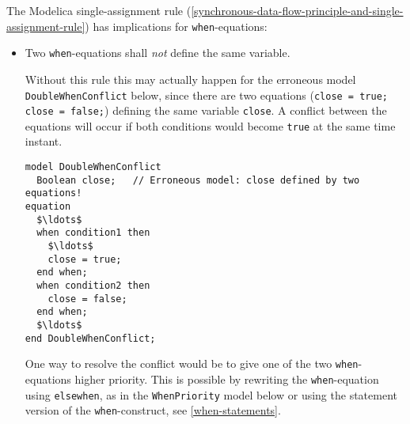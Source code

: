 The Modelica single-assignment rule (\cref{synchronous-data-flow-principle-and-single-assignment-rule}) has implications for \lstinline!when!-equations:
\begin{itemize}
\item
  Two \lstinline!when!-equations shall \emph{not} define the same variable.

\begin{nonnormative}
Without this rule this may actually happen for the erroneous model \lstinline!DoubleWhenConflict! below, since there are two equations (\lstinline!close = true; close = false;!) defining the same variable \lstinline!close!.
A conflict between the equations will occur if both conditions would become \lstinline!true! at the same time instant.
\begin{lstlisting}[language=modelica]
model DoubleWhenConflict
  Boolean close;   // Erroneous model: close defined by two equations!
equation
  $\ldots$
  when condition1 then
    $\ldots$
    close = true;
  end when;
  when condition2 then
    close = false;
  end when;
  $\ldots$
end DoubleWhenConflict;
\end{lstlisting}

One way to resolve the conflict would be to give one of the two \lstinline!when!-equations higher priority.
This is possible by rewriting the \lstinline!when!-equation using \lstinline!elsewhen!, as in the \lstinline!WhenPriority! model below or using the statement version of the \lstinline!when!-construct, see \cref{when-statements}.
\end{nonnormative}


\end{itemize}
